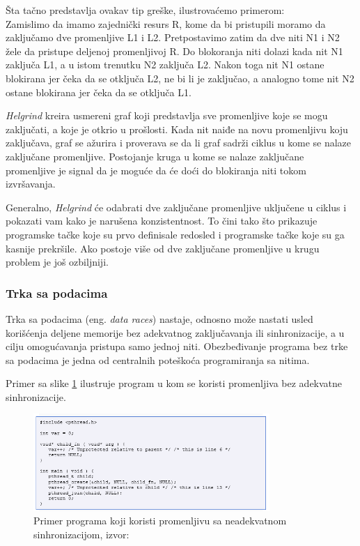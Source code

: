 \documentclass[12pt,oneside]{memoir}
\theoremstyle{plain}
\theoremstyle{definition}
\begin{document}
Šta tačno predstavlja ovakav tip greške, ilustrovaćemo primerom:\\
Zamislimo da imamo zajednički resurs R, kome da bi pristupili moramo da zaključamo dve promenljive L1 i L2. Pretpostavimo zatim da dve niti N1 i N2 žele da pristupe deljenoj promenljivoj R. Do blokoranja niti dolazi kada nit N1 zaključa L1, a u istom trenutku N2 zaključa L2. Nakon toga nit N1 ostane blokirana jer čeka da se otključa L2, ne bi li je zaključao, a analogno tome nit N2 ostane blokirana jer čeka da se otključa L1.

\textit{Helgrind} kreira usmereni graf koji predstavlja sve promenljive koje se mogu zaključati, a koje je otkrio u prošlosti. Kada nit naiđe na novu promenljivu koju zaključava, graf se ažurira i proverava se da li graf sadrži ciklus u kome se nalaze zaključane promenljive. Postojanje kruga u kome se nalaze zaključane promenljive je signal da je moguće da će doći do blokiranja niti tokom izvršavanja.

Generalno, \textit{Helgrind} će odabrati dve zaključane promenljive uključene u ciklus i pokazati vam kako je narušena konzistentnost. To čini tako što prikazuje programske tačke koje su prvo definisale redosled i programske tačke koje su ga kasnije prekršile. Ako postoje više od dve zaključane promenljive u krugu problem je još ozbiljniji.


\subsubsection{Trka sa podacima}
Trka sa podacima (eng. \textit{data races}) nastaje, odnosno može nastati usled korišćenja deljene memorije bez adekvatnog zaključavanja ili sinhronizacije, a u cilju omogućavanja pristupa samo jednoj niti. Obezbeđivanje programa bez trke sa podacima je jedna od centralnih poteškoća programiranja sa nitima. 

Primer sa slike \ref{fig:slika2.20} ilustruje program u kom se koristi promenljiva bez adekvatne sinhronizacije.
\begin{figure}[!ht]
  \centering
  \includegraphics[width=0.8\textwidth]{DataRace.png}
  \caption{Primer programa koji koristi promenljivu sa neadekvatnom sinhronizacijom, izvor: \cite{Helgrind}}
  \label{fig:slika2.20}
\end{figure}
\end{document}
